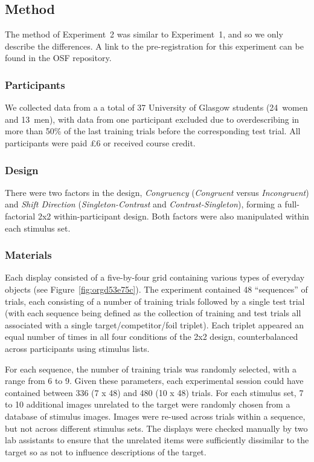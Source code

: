 \documentclass[natbib,doc,a4paper]{apa6}
\begin{document}
\subsection*{Method}
\label{sec:org7382a38}

The method of Experiment~2 was similar to Experiment~1, and so we only describe the differences. A link to the pre-registration for this experiment can be found in the OSF repository.

\subsubsection*{Participants}
\label{sec:org39aab43}

We collected data from a a total of 37 University of Glasgow students (24~women and 13~men), with data from one participant excluded due to overdescribing in more than 50\% of the last training trials before the corresponding test trial. All participants were paid £6 or received course credit.

\subsubsection*{Design}
\label{sec:orga6b9956}

There were two factors in the design, \emph{Congruency} (\emph{Congruent} versus \emph{Incongruent}) and \emph{Shift Direction} (\emph{Singleton-Contrast} and \emph{Contrast-Singleton}), forming a full-factorial 2x2 within-participant design.  Both factors were also manipulated within each stimulus set.

\subsubsection*{Materials}
\label{sec:org0b1de97}

Each display consisted of a five-by-four grid containing various types of everyday objects (see Figure~\ref{fig:orgd53e75c}). The experiment contained 48 ``sequences'' of trials, each consisting of a number of training trials followed by a single test trial (with each sequence being defined as the collection of training and test trials all associated with a single target/competitor/foil triplet). Each triplet appeared an equal number of times in all four conditions of the 2x2 design, counterbalanced across participants using stimulus lists.

For each sequence, the number of training trials was randomly selected, with a range from 6 to 9. Given these parameters, each experimental session could have contained between 336 (7 x 48) and 480 (10 x 48) trials. For each stimulus set, 7 to 10 additional images unrelated to the target were randomly chosen from a database of stimulus images. Images were re-used across trials within a sequence, but not across different stimulus sets. The displays were checked manually by two lab assistants to ensure that the unrelated items were sufficiently dissimilar to the target so as not to influence descriptions of the target.
\end{document}

